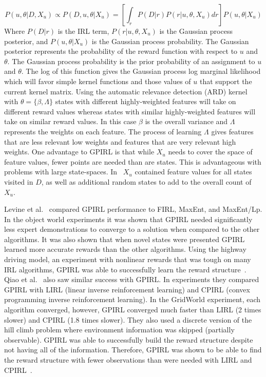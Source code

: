 \documentclass[12pt,american]{report}
\begin{document}
\begin{equation}
            \label{eq:GP_full}
           P(u,\theta|D,X_u)\propto P(D,u,\theta|X_u) = [\int_{r}P(D|r)P(r|u,\theta,X_u)dr]P(u,\theta|X_u)%
        \end{equation}
Where $P(D|r)$ is the IRL term, $P(r|u,\theta,X_u)$ is the Gaussian process posterior, and $P(u,\theta|X_u)$ is the Gaussian process probability.  The Gaussian posterior represents the probability of the reward function with respect to $u$ and $\theta$. The Gaussian process probability is the prior probability of an assignment to $u$ and $\theta$. The log of this function gives the Gaussian process log marginal likelihood which will favor simple kernel functions and those values of $u$ that support the current kernel matrix.  Using the automatic relevance detection (ARD) kernel with $\theta = \{ \beta,\Lambda \}$ states with different highly-weighted features will take on different reward values whereas states with similar highly-weighted features will take on similar reward values. In this case $\beta$ is the overall variance and $\Lambda$ represents the weights on each feature. The process of learning $\Lambda$ gives features that are less relevant low weights and features that are very relevant high weights. One advantage to GPIRL is that while $X_u$ needs to cover the space of feature values, fewer points are needed than are states.  This is advantageous with problems with large state-spaces. In~\cite{levine2011nonlinear} $X_u$ contained feature values for all states visited in $D$, as well as additional random states to add to the overall count of $X_u$. 

Levine et al.~\cite{levine2011nonlinear} compared GPIRL performance to FIRL, MaxEnt, and MaxEnt/Lp. In the object world experiments it was shown that GPIRL needed significantly less expert demonstrations to converge to a solution when compared to the other algorithms. It was also shown that when novel states were presented GPIRL learned more accurate rewards than the other algorithms.  Using the highway driving model, an experiment with nonlinear rewards that was tough on many IRL algorithms, GPIRL was able to successfully learn the reward structure~\cite{levine2011nonlinear}. Qiao et al.~\cite{qiao2011inverse} also saw similar success with GPIRL.  In experiments they compared GPIRL with LIRL (linear inverse reinforcement learning) and CPIRL (convex programming inverse reinforcement learning). In the GridWorld experiment, each algorithm converged, however, GPIRL converged much faster than LIRL (2 times slower) and CPIRL (1.8 times slower).  They also used a discrete version of the hill climb problem where  environment information was skipped (partially observable).  GPIRL was able to successfully build the reward structure despite not having all of the information. Therefore, GPIRL was shown to be able to find the reward structure with fewer observations than were needed with LIRL and CPIRL~\cite{qiao2011inverse}.
\end{document}
